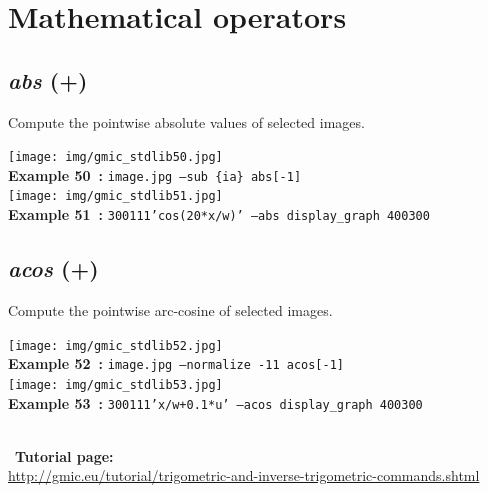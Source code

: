 \documentclass[a4paper,10.5pt,twoside]{book}
\def\comma{\discretionary{,}{}{,}}
\begin{document}
\section{Mathematical operators}


\subsection{\emph{abs} (+)}\vspace*{-0.7em}
Compute the pointwise absolute values of selected images.
\begin{center}\texttt{[image: img/gmic\_stdlib50.jpg]}\\
{\footnotesize \textbf{Example 50~:} \texttt{image.jpg --sub \{ia\} abs[-1]}}
\\\texttt{[image: img/gmic\_stdlib51.jpg]}\\
{\footnotesize \textbf{Example 51~:} \texttt{300{\comma}1{\comma}1{\comma}1{\comma}'cos(20*x/w)' --abs display\_graph 400{\comma}300}}
\end{center}

\subsection{\emph{acos} (+)}\vspace*{-0.7em}
Compute the pointwise arc-cosine of selected images.
\begin{center}\texttt{[image: img/gmic\_stdlib52.jpg]}\\
{\footnotesize \textbf{Example 52~:} \texttt{image.jpg --normalize -1{\comma}1 acos[-1]}}
\\\texttt{[image: img/gmic\_stdlib53.jpg]}\\
{\footnotesize \textbf{Example 53~:} \texttt{300{\comma}1{\comma}1{\comma}1{\comma}'x/w+0.1*u' --acos display\_graph 400{\comma}300}}
\end{center}
~\\
~\textbf{Tutorial page: }\\\url{http://gmic.eu/tutorial/trigometric-and-inverse-trigometric-commands.shtml}
\end{document}
